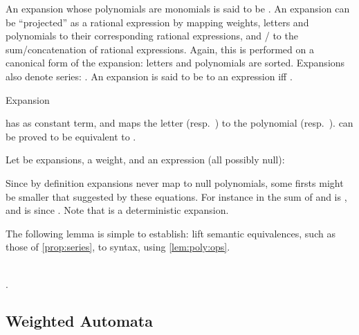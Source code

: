 \documentclass[a4paper,USenglish]{lipics}
\begin{document}
An expansion whose polynomials are monomials is said to be
.  An expansion  can be ``projected'' as a rational
expression  by mapping weights, letters and polynomials to their
corresponding rational expressions, and / to the
sum/concatenation of rational expressions.  Again, this is performed on a
canonical form of the expansion: letters and polynomials are sorted.
Expansions also denote series: .  An
expansion  is said to be  to an expression  iff
.

\begin{Example}
  \label{ex:e1:xpn}
  Expansion
  
  has  as constant term, and maps the letter 
  (resp.\ ) to the polynomial  (resp.\
  ).   can be proved to be equivalent to
  .
\end{Example}

Let  be expansions,  a weight, and  an expression (all
possibly null):

Since by definition expansions never map to null polynomials, some firsts
might be smaller that suggested by these equations.  For instance in
 the sum of  and
 is , and
 is
 since .  Note that  is a
deterministic expansion.

The following lemma is simple to establish: lift semantic equivalences,
such as those of \cref{prop:series}, to syntax, using \cref{lem:poly:ops}.
\begin{Lemma}
  \label{lem:xpn:semantics}
  \\
  .
\end{Lemma}

\subsection{Weighted Automata}
\end{document}
